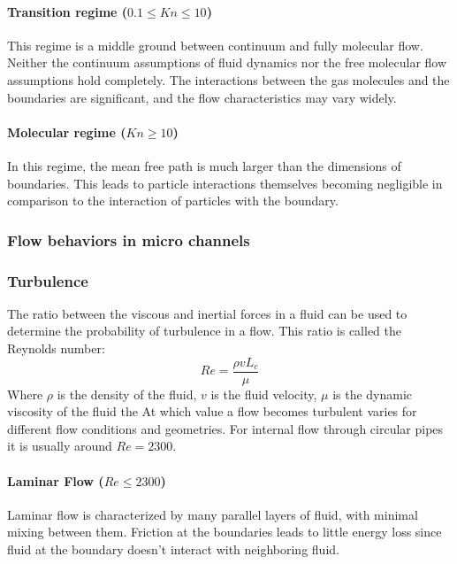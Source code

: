 	\newpage

\paragraph{Transition regime (\(0.1 \leq Kn \leq 10\))}
	
	This regime is a middle ground between continuum and fully molecular flow.
	Neither the continuum assumptions of fluid dynamics nor the free molecular flow assumptions hold completely.
	The interactions between the gas molecules and the boundaries are significant, and the flow characteristics may vary widely.

\paragraph{Molecular regime (\(Kn \geq 10\))}

	In this regime, the mean free path is much larger than the dimensions of boundaries.
	This leads to particle interactions themselves becoming negligible in comparison to the interaction of particles with the boundary.
	\cite{rapp2017microfluidics}

\subsubsection{Flow behaviors in micro channels}

	

\subsubsection{Turbulence}

	The ratio between the viscous and inertial forces in a fluid can be used to determine the probability of turbulence in a flow.
	This ratio is called the Reynolds number:
	$$
		Re = \frac{\rho v L_c}{\mu}
	$$
	Where  $\rho$ is the density of the fluid, $v$ is the fluid velocity, $\mu$ is the dynamic viscosity of the fluid the  At which value a flow becomes turbulent varies for different flow conditions and geometries. For internal flow through circular pipes it is usually around $Re = 2300$. \cite{Cengel2017}
	
\paragraph{Laminar Flow (\(Re \le 2300\))}

	Laminar flow is characterized by many parallel layers of fluid, with minimal mixing between them.
	Friction at the boundaries leads to little energy loss since fluid at the boundary doesn't interact with neighboring fluid.
	
